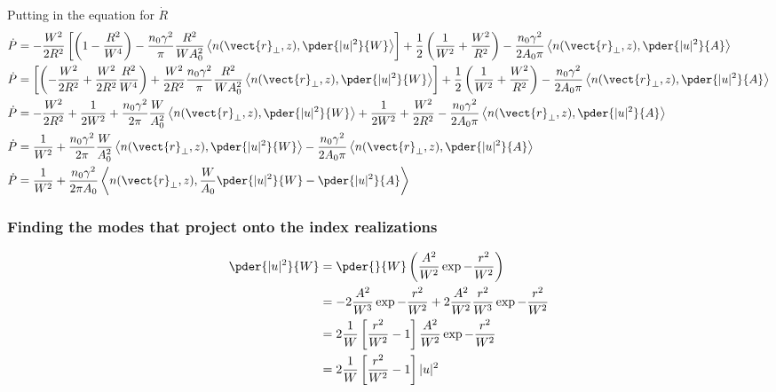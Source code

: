 Putting in the equation for $\dot{R}$
\begin{equation}
\begin{split}
  \dot{P}  &= - \frac{W^2}{2R^2}\left[\left(1 -  \frac{R^2}{W^4 }\right) -  \frac{n_0 \gamma^2}{\pi} \frac{R^2}{W A_0^2 } \left< n(\vect{r}_{\perp},z),\pder{|u|^2}{W}  \right> \right] + \frac{1}{2}\left(\frac{1}{W^2} + \frac{W^2}{R^2}\right) -  \frac{n_0 \gamma^2}{ 2 A_0 \pi} \left< n(\vect{r}_{\perp},z),\pder{|u|^2}{A}\right>  \\    
  \dot{P}  &= \left[\left(- \frac{W^2}{2R^2} +  \frac{W^2}{2R^2} \frac{R^2}{W^4 }\right) + \frac{W^2}{2R^2}  \frac{n_0 \gamma^2}{\pi} \frac{R^2}{W A_0^2 } \left< n(\vect{r}_{\perp},z),\pder{|u|^2}{W}  \right> \right] + \frac{1}{2}\left(\frac{1}{W^2} + \frac{W^2}{R^2}\right) -  \frac{n_0 \gamma^2}{ 2 A_0 \pi} \left< n(\vect{r}_{\perp},z),\pder{|u|^2}{A}\right>  \\   
 \dot{P}  &= - \frac{W^2}{2R^2} + \frac{1}{2W^2 } +  \frac{n_0 \gamma^2}{2\pi} \frac{W}{ A_0^2 } \left< n(\vect{r}_{\perp},z),\pder{|u|^2}{W}  \right>  + \frac{1}{2W^2} + \frac{W^2}{2R^2} -  \frac{n_0 \gamma^2}{ 2 A_0 \pi} \left< n(\vect{r}_{\perp},z),\pder{|u|^2}{A}\right>  \\ 
 \dot{P}  &=  \frac{1}{W^2 } +  \frac{n_0 \gamma^2}{2\pi} \frac{W}{ A_0^2 } \left< n(\vect{r}_{\perp},z),\pder{|u|^2}{W}  \right>   -  \frac{n_0 \gamma^2}{ 2 A_0 \pi} \left< n(\vect{r}_{\perp},z),\pder{|u|^2}{A}\right>  \\ 
  \dot{P}  &=  \frac{1}{W^2 } +  \frac{n_0 \gamma^2}{2\pi A_0} \left< n(\vect{r}_{\perp},z),\frac{W}{ A_0 } \pder{|u|^2}{W}  - \pder{|u|^2}{A}\right>  \\
\end{split}
\end{equation}


\subsubsection{Finding the modes that project onto the index realizations}


\begin{equation}
\begin{split}
  \pder{|u|^2}{W} &= \pder{}{W}\left(\frac{A^2}{W^2}\exp{-\frac{r^2}{W^2}}\right)\\
  &= -2\frac{A^2}{W^3} \exp{-\frac{r^2}{W^2}} + 2\frac{A^2}{W^2}\frac{r^2}{W^3}\exp{-\frac{r^2}{W^2}}\\
  &= 2\frac{1}{W}\left[\frac{r^2 }{W^2} - 1\right] \frac{A^2}{W^2} \exp{-\frac{r^2}{W^2}}\\
  &= 2\frac{1}{W}\left[\frac{r^2 }{W^2} - 1\right] |u|^2
\end{split}
\end{equation}

